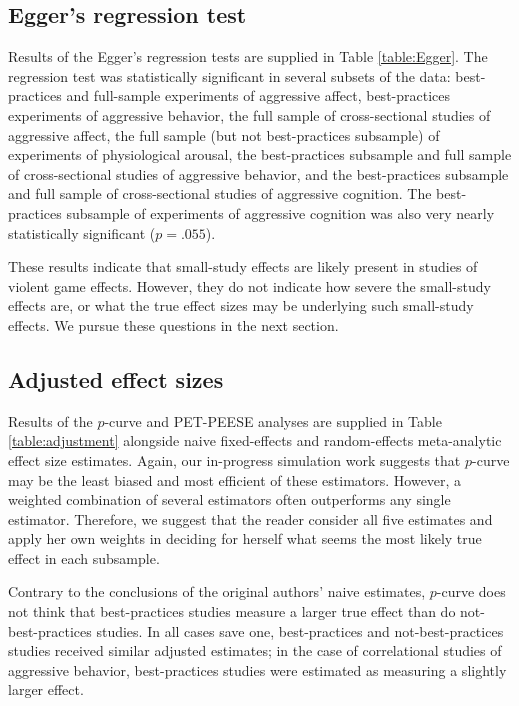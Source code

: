 \documentclass[man]{apa6}
\begin{document}
\subsection{Egger's regression test}
Results of the Egger's regression tests are supplied in Table \ref{table:Egger}. The regression test was statistically significant in several subsets of the data: best-practices and full-sample experiments of aggressive affect, best-practices experiments of aggressive behavior, the full sample of cross-sectional studies of aggressive affect, the full sample (but not best-practices subsample) of experiments of physiological arousal, the best-practices subsample and full sample of cross-sectional studies of aggressive behavior, and the best-practices subsample and full sample of cross-sectional studies of aggressive cognition. The best-practices subsample of experiments of aggressive cognition was also very nearly statistically significant ($p = .055$).

These results indicate that small-study effects are likely present in studies of violent game effects. However, they do not indicate how severe the small-study effects are, or what the true effect sizes may be underlying such small-study effects. We pursue these questions in the next section.

\subsection{Adjusted effect sizes}
Results of the $p$-curve and PET-PEESE analyses are supplied in Table \ref{table:adjustment} alongside naive fixed-effects and random-effects meta-analytic effect size estimates. Again, our in-progress simulation work suggests that $p$-curve may be the least biased and most efficient of these estimators. However, a weighted combination of several estimators often outperforms any single estimator. Therefore, we suggest that the reader consider all five estimates and apply her own weights in deciding for herself what seems the most likely true effect in each subsample.  

Contrary to the conclusions of the original authors' naive estimates, $p$-curve does not think that best-practices studies measure a larger true effect than do not-best-practices studies. In all cases save one, best-practices and not-best-practices studies received similar adjusted estimates; in the case of correlational studies of aggressive behavior, best-practices studies were estimated as measuring a slightly larger effect. 
\end{document}
